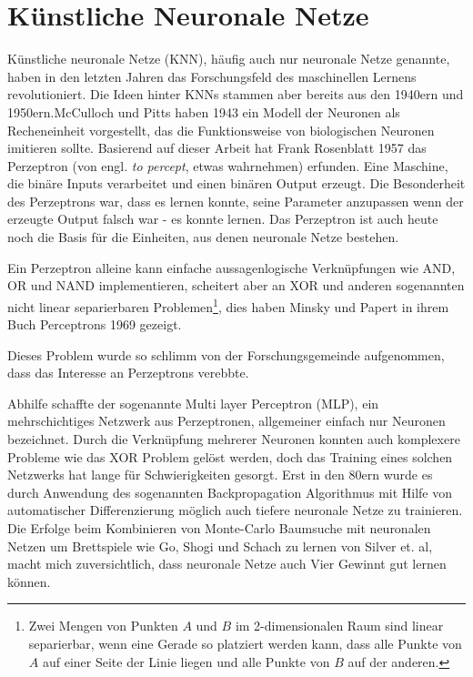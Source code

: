 \section{Künstliche Neuronale Netze}
\label{chap:networks}
Künstliche neuronale Netze (KNN), häufig auch nur neuronale Netze genannte, haben in den letzten Jahren das Forschungsfeld des maschinellen Lernens revolutioniert. Die Ideen hinter KNNs stammen aber bereits aus den 1940ern und 1950ern.McCulloch und Pitts haben 1943 ein Modell der Neuronen als Recheneinheit vorgestellt, das die Funktionsweise von biologischen Neuronen imitieren sollte. Basierend auf dieser Arbeit hat Frank Rosenblatt 1957 das Perzeptron (von engl. \textit{to percept}, etwas wahrnehmen) erfunden. Eine Maschine, die binäre Inputs verarbeitet und einen binären Output erzeugt. Die Besonderheit des Perzeptrons war, dass es lernen konnte, seine Parameter anzupassen wenn der erzeugte Output falsch war - es konnte lernen. Das Perzeptron ist auch heute noch die Basis für die Einheiten, aus denen neuronale Netze bestehen.
\par 
Ein Perzeptron alleine kann einfache aussagenlogische Verknüpfungen wie AND, OR und NAND implementieren, scheitert aber an XOR und anderen sogenannten nicht linear separierbaren Problemen\footnote{Zwei Mengen von Punkten $A$ und $B$ im 2-dimensionalen Raum sind linear separierbar, wenn eine Gerade so platziert werden kann, dass alle Punkte von $A$ auf einer Seite der Linie liegen und alle Punkte von $B$ auf der anderen.}, dies haben Minsky und Papert in ihrem Buch Perceptrons 1969 gezeigt.

Dieses Problem wurde so schlimm von der Forschungsgemeinde aufgenommen, dass das Interesse an Perzeptrons verebbte.

Abhilfe schaffte der sogenannte Multi layer Perceptron (MLP), ein mehrschichtiges Netzwerk aus Perzeptronen, allgemeiner einfach nur Neuronen bezeichnet. Durch die Verknüpfung mehrerer Neuronen konnten auch komplexere Probleme wie das XOR Problem gelöst werden, doch das Training eines solchen Netzwerks hat lange für Schwierigkeiten gesorgt. Erst in den 80ern wurde es durch Anwendung des sogenannten Backpropagation Algorithmus mit Hilfe von automatischer Differenzierung möglich auch tiefere neuronale Netze zu trainieren.\\

Die Erfolge beim Kombinieren von Monte-Carlo Baumsuche mit neuronalen Netzen um Brettspiele wie Go, Shogi und Schach zu lernen von Silver et. al\cite{silverMastering}, macht mich zuversichtlich, dass neuronale Netze auch Vier Gewinnt gut lernen können.

